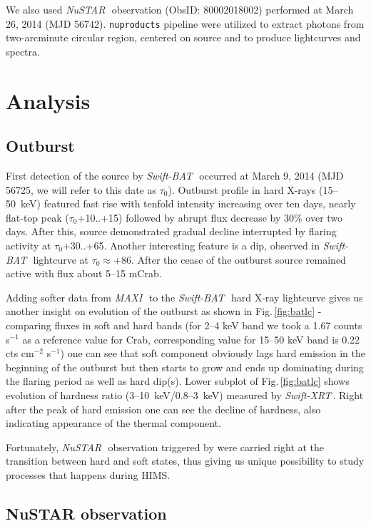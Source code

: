 \documentclass[a4paper,fleqn,usenatbib]{mnras}
\def\swiftx{{\em Swift-XRT\,}}
\def\swiftb{{\em Swift-BAT\,}}
\def\nustar{{\em NuSTAR\,}}
\def\maxi{{\em MAXI\,}}
\begin{document}
We also used \nustar\, observation (ObsID: 80002018002) performed at March 26, 2014 (MJD 56742). 
{\texttt{nuproducts}} pipeline were utilized to extract photons from two-arcminute circular region, centered on source and to produce lightcurves and spectra.

\section{Analysis}
\subsection{Outburst}
First detection of the source by \swiftb\, \citep{krimm14_atel} occurred at March 9, 2014 (MJD 56725, we will refer to this date as $\tau_{0}$). 
Outburst profile in hard X-rays (15--50~keV) featured fast rise with tenfold intensity increasing over ten days, nearly flat-top peak ($\tau_{0}$+10..+15) followed by abrupt flux decrease by 30\% over two days.
After this, source demonstrated gradual decline interrupted by flaring activity at $\tau_{0}$+30..+65. 
Another interesting feature is a dip, observed in \swiftb\, lightcurve at $\tau_{0} \approx +86$. 
After the cease of the outburst source remained active with flux about 5--15 mCrab. 

Adding softer data from \maxi\, to the \swiftb\, hard X-ray lightcurve gives us another insight on evolution of the outburst as shown in Fig.\,\ref{fig:batlc} - comparing fluxes in soft and hard bands (for 2--4 keV band we took a 1.67 counts s$^{-1}$ as a reference value for Crab, corresponding value for 15--50 keV band is 0.22 cts cm$^{-2}$ s$^{-1}$) one can see that soft component obviously lags hard emission in the beginning of the outburst but then starts to grow and ends up dominating during the flaring period as well as hard dip(s). 
Lower subplot of Fig.\,\ref{fig:batlc} shows evolution of hardness ratio (3--10~keV/0.8--3~keV) measured by \swiftx. 
Right after the peak of hard emission one can see the decline of hardness, also indicating appearance of the thermal component.

Fortunately, \nustar\ observation triggered by \cite{miller15_nust} were carried right at the transition between hard and soft states, thus giving us unique possibility to study processes that happens during HIMS. 

\subsection{NuSTAR observation}
\label{sec:nust} 
\end{document}
